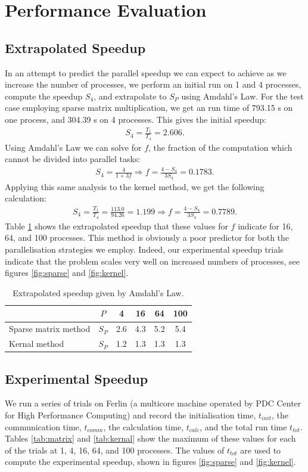 \documentclass[a4paper,11pt]{article}
\newcommand{\ba}[1]{\begin{align*}    #1    \end{align*}}
\begin{document}
\section*{Performance Evaluation}
\subsection*{Extrapolated Speedup}
In an attempt to predict the parallel speedup we can expect to achieve as we increase the number of processes, we perform an initial run on 1 and 4 processes, compute the speedup $S_4$, and extrapolate to $S_P$ using Amdahl's Law.  For the test case employing sparse matrix multiplication, we get an run time of 793.15 s on one process, and 304.39 s on 4 processes.  This gives the initial speedup:
\ba{
S_4 = \frac{T_1}{T_4} = 2.606.
}
Using Amdahl's Law we can solve for $f$, the fraction of the computation which cannot be divided into parallel tasks:
\ba{
S_4 = \frac{4}{1+3f} \Rightarrow f = \frac{4-S_4}{3S_4} = 0.1783.
}
Applying this same analysis to the kernel method, we get the following calculation:
\ba{
S_4 = \frac{T_1}{T_4} = \frac{113.0}{94.26} =  1.199 \Rightarrow f = \frac{4-S_4}{3S_4} = 0.7789.
}
Table \ref{tab:S_extrap} shows the extrapolated speedup that these values for $f$ indicate for 16, 64, and 100 processes.  This method is obviously a poor predictor for both the parallelisation strategies we employ.  Indeed, our experimental speedup trials indicate that the problem scales very well on increased numbers of processes, see figures \ref{fig:sparse} and \ref{fig:kernel}.

\begin{table}[h]
\def\arraystretch{1.2}
\begin{center}
\caption{Extrapolated speedup given by Amdahl's Law.}
\label{tab:S_extrap}
\begin{tabular}{| l | c | c | c | c | c |}
\hline
&$P$ & 4 & 16 & 64 & 100 \\
\hline
Sparse matrix method & $S_P $& 2.6 & 4.3 & 5.2 & 5.4\\
\hline
Kernal method & $S_P $& 1.2 & 1.3 & 1.3 & 1.3\\
\hline
\end{tabular}
\end{center}
\end{table}

\subsection*{Experimental Speedup}
We run a series of trials on Ferlin (a multicore machine operated by PDC Center for High Performance Computing) and record the initialisation time, $t_{init}$, the communication time, $t_{comm}$, the calculation time, $t_{calc}$, and the total run time $t_{tot}$.  Tables \ref{tab:matrix} and \ref{tab:kernal} show the maximum of these values for each of the trials at 1, 4, 16, 64, and 100 processes.  The values of $t_{tot}$ are used to compute the experimental speedup, shown in figures \ref{fig:sparse} and \ref{fig:kernel}.
\end{document}
